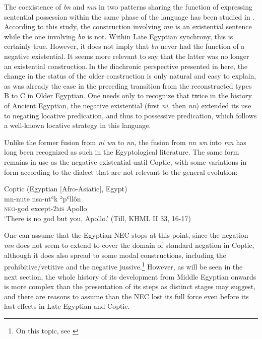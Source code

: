 \documentclass[output=paper]{langsci/langscibook}
\newcommand{\ꜥ}{ʿ}
\newcommand{\ꜣ}{\kern-.25pt\texttt{ꜣ}\kern-.6pt}
\begin{document}
The coexistence of \textit{bn} and \textit{mn} in two patterns sharing the function of expressing sentential possession within the same phase of the language has been studied in \citet{Depuydt2008}.
According to this study, the construction involving \textit{mn} is an existential sentence while the one involving \textit{bn} is not. Within Late Egyptian synchrony, this is certainly true. However, it does not imply that \textit{bn} never had the function of a negative existential. It seems more relevant to say that the latter was no longer an existential construction. In the diachronic perspective presented in here, the change in the status of the older construction is only natural and easy to explain, as was already the case in the preceding transition from the reconstructed types B to C in Older Egyptian. One needs only to recognize that twice in the history of Ancient Egyptian, the negative existential (first \textit{ni}, then \textit{nn}) extended its use to negating locative predication, and thus to possessive predication, which follows a well-known locative strategy in this language. 
 
Unlike the former fusion from \textit{ni wn} to \textit{nn}, the fusion from \textit{nn wn} into \textit{mn} has long been recognized as such in the Egyptological literature. The same form remains in use as the negative existential until Coptic, with some variations in form according to the dialect that are not relevant to the general evolution:  

\ea Coptic (Egyptian [Afro-Asiatic], Egypt) \label{ex:AE45}\\
    \gll mn-nute nsa-nt{\ꜥ}k ʾp{\ꜥ}llôn \\
    \textsc{neg}-god except-\textsc{2ms} Apollo\\ 
    \glt ‘There is no god but you, Apollo.’ (Till, KHML II 33, 16-17)
\z{}
 
One can assume that the Egyptian NEC stops at this point, since the negation \textit{mn} does not seem to extend to cover the domain of standard negation in Coptic, although it does also spread to some modal constructions, including the prohibitive/vetitive and the negative jussive.\footnote{On this topic, see \citet{GrossmanPolisforthcoming}}
However, as will be seen in the next section, the whole history of its development from Middle Egyptian onwards is more complex than the presentation of its steps as distinct stages may suggest, and there are reasons to assume than the NEC lost its full force even before its last effects in Late Egyptian and Coptic. 
\end{document}
